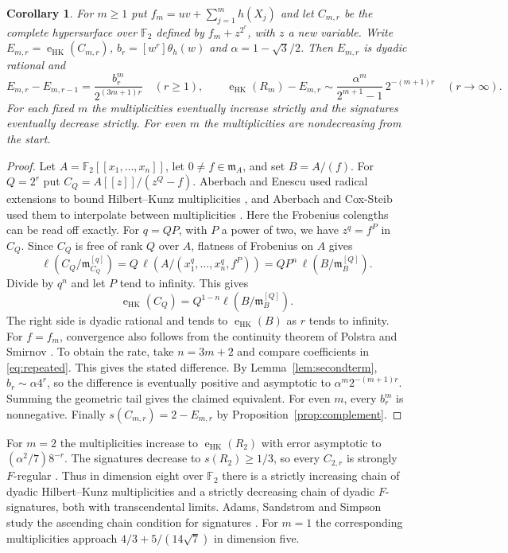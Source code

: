 \documentclass[11pt,a4paper,reqno]{amsart}
\numberwithin{equation}{section}
\theoremstyle{plain}
\newtheorem{corollary}[theorem]{Corollary}
\newcommand{\eHK}{\operatorname{e}_{\mathrm{HK}}}
\begin{document}
\begin{corollary}\label{cor:monotone}
For $m\ge1$ put $f_m=uv+\sum_{j=1}^m h(X_j)$ and let $C_{m,r}$ be the complete hypersurface over $\mathbb F_2$ defined by $f_m+z^{2^r}$, with $z$ a new variable. Write $E_{m,r}=\eHK(C_{m,r})$, $b_r=[w^r]\theta_h(w)$ and $\alpha=1-\sqrt3/2$. Then $E_{m,r}$ is dyadic rational and
\[
 E_{m,r}-E_{m,r-1}=\frac{b_r^m}{2^{(3m+1)r}}\quad(r\ge1),\qquad
 \eHK(R_m)-E_{m,r}\sim
 \frac{\alpha^m}{2^{m+1}-1}\,2^{-(m+1)r}\quad(r\to\infty).
\]
For each fixed $m$ the multiplicities eventually increase strictly and the signatures eventually decrease strictly. For even $m$ the multiplicities are nondecreasing from the start.
\end{corollary}
\begin{proof}
Let $A=\mathbb F_2[[x_1,\ldots,x_n]]$, let $0\ne f\in\mathfrak m_A$, and set $B=A/(f)$. For $Q=2^r$ put $C_Q=A[[z]]/(z^Q-f)$. Aberbach and Enescu used radical extensions to bound Hilbert--Kunz multiplicities \cite{AE}, and Aberbach and Cox-Steib used them to interpolate between multiplicities \cite{ACS}. Here the Frobenius colengths can be read off exactly. For $q=QP$, with $P$ a power of two, we have $z^q=f^P$ in $C_Q$. Since $C_Q$ is free of rank $Q$ over $A$, flatness of Frobenius on $A$ gives
\[
 \ell(C_Q/\mathfrak m_{C_Q}^{[q]})
 =Q\,\ell(A/(x_1^q,\ldots,x_n^q,f^P))
 =QP^n\,\ell(B/\mathfrak m_B^{[Q]}).
\]
Divide by $q^n$ and let $P$ tend to infinity. This gives
\[
 \eHK(C_Q)=Q^{1-n}\ell(B/\mathfrak m_B^{[Q]}).
\]
The right side is dyadic rational and tends to $\eHK(B)$ as $r$ tends to infinity. For $f=f_m$, convergence also follows from the continuity theorem of Polstra and Smirnov \cite{PS}. To obtain the rate, take $n=3m+2$ and compare coefficients in \eqref{eq:repeated}. This gives the stated difference. By Lemma~\ref{lem:secondterm}, $b_r\sim\alpha4^r$, so the difference is eventually positive and asymptotic to $\alpha^m2^{-(m+1)r}$. Summing the geometric tail gives the claimed equivalent. For even $m$, every $b_r^m$ is nonnegative. Finally $s(C_{m,r})=2-E_{m,r}$ by Proposition~\ref{prop:complement}.
\end{proof}

For $m=2$ the multiplicities increase to $\eHK(R_2)$ with error asymptotic to $(\alpha^2/7)8^{-r}$. The signatures decrease to $s(R_2)\ge1/3$, so every $C_{2,r}$ is strongly $F$-regular \cite{AL03}. Thus in dimension eight over $\mathbb F_2$ there is a strictly increasing chain of dyadic Hilbert--Kunz multiplicities and a strictly decreasing chain of dyadic $F$-signatures, both with transcendental limits. Adams, Sandstrom and Simpson study the ascending chain condition for signatures \cite{ASS}. For $m=1$ the corresponding multiplicities approach $4/3+5/(14\sqrt7)$ in dimension five.
\end{document}
